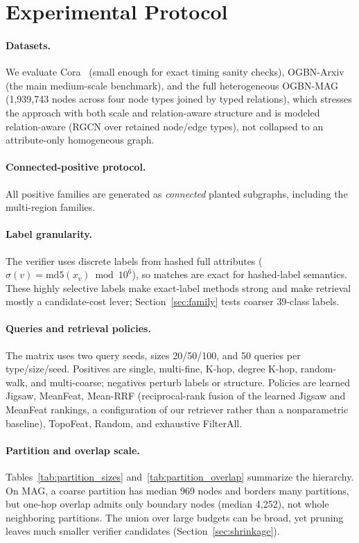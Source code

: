 \documentclass[runningheads]{llncs}
\begin{document}
\section{Experimental Protocol}

\paragraph{Datasets.}
We evaluate Cora~\cite{ref_cora} (small enough for exact timing sanity checks), OGBN-Arxiv~\cite{ref_ogb} (the main medium-scale benchmark), and the full heterogeneous OGBN-MAG (1{,}939{,}743 nodes across four node types joined by typed relations), which stresses the approach with both scale and relation-aware structure and is modeled relation-aware (RGCN over retained node/edge types), not collapsed to an attribute-only homogeneous graph.

\paragraph{Connected-positive protocol.}
All positive families are generated as \emph{connected} planted subgraphs, including the multi-region families.

\paragraph{Label granularity.} The verifier uses discrete labels from hashed full attributes ($\sigma(v)=\mathrm{md5}(x_v)\bmod 10^{6}$), so matches are exact for hashed-label semantics. These highly selective labels make exact-label methods strong and make retrieval mostly a candidate-cost lever; Section~\ref{sec:family} tests coarser $39$-class labels.

\paragraph{Queries and retrieval policies.}
The matrix uses two query seeds, sizes 20/50/100, and 50 queries per type/size/seed. Positives are single, multi-fine, K-hop, degree K-hop, random-walk, and multi-coarse; negatives perturb labels or structure. Policies are learned Jigsaw, MeanFeat, Mean-RRF (reciprocal-rank fusion of the learned Jigsaw and MeanFeat rankings, a configuration of our retriever rather than a nonparametric baseline), TopoFeat, Random, and exhaustive FilterAll.

\paragraph{Partition and overlap scale.}
Tables~\ref{tab:partition_sizes} and~\ref{tab:partition_overlap} summarize the hierarchy. On MAG, a coarse partition has median 969 nodes and borders many partitions, but one-hop overlap admits only boundary nodes (median 4{,}252), not whole neighboring partitions. The union over large budgets can be broad, yet pruning leaves much smaller verifier candidates (Section~\ref{sec:shrinkage}).
\end{document}
